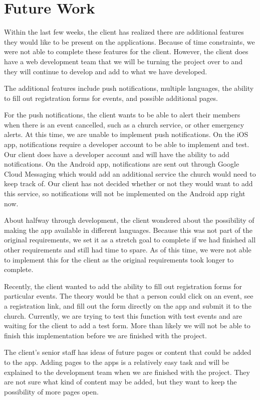 \documentclass[letterpaper,10pt,draftclsnofoot,onecolumn,titlepage]{IEEEtran}
\begin{document}
\section{Future Work}
		Within the last few weeks, the client has realized there are additional features they would like to be present on the applications.
		Because of time constraints, we were not able to complete these features for the client.
		However, the client does have a web development team that we will be turning the project over to and they will continue to develop and add to what we have developed.

		The additional features include push notifications, multiple languages, the ability to fill out registration forms for events, and possible additional pages.

		For the push notifications, the client wants to be able to alert their members when there is an event cancelled, such as a church service, or other emergency alerts.
		At this time, we are unable to implement push notifications.
		On the iOS app, notifications require a developer account to be able to implement and test.
		Our client does have a developer account and will have the ability to add notifications.
		On the Android app, notifications are sent out through Google Cloud Messaging which would add an additional service the church would need to keep track of.
		Our client has not decided whether or not they would want to add this service, so notifications will not be implemented on the Android app right now.

		About halfway through development, the client wondered about the possibility of making the app available in different languages.
		Because this was not part of the original requirements, we set it as a stretch goal to complete if we had finished all other requirements and still had time to spare.
		As of this time, we were not able to implement this for the client as the original requirements took longer to complete.

		Recently, the client wanted to add the ability to fill out registration forms for particular events.
		The theory would be that a person could click on an event, see a registration link, and fill out the form directly on the app and submit it to the church.
		Currently, we are trying to test this function with test events and are waiting for the client to add a test form.
		More than likely we will not be able to finish this implementation before we are finished with the project.

		The client's senior staff has ideas of future pages or content that could be added to the app.
		Adding pages to the apps is a relatively easy task and will be explained to the development team when we are finished with the project.
		They are not sure what kind of content may be added, but they want to keep the possibility of more pages open.
\end{document}
